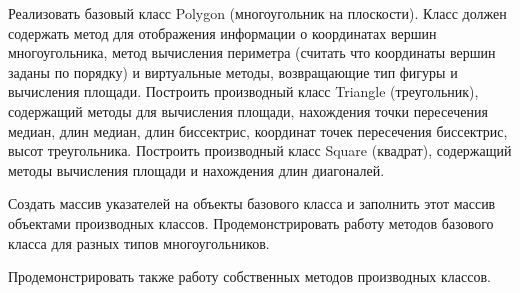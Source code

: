 Реализовать базовый класс Polygon (многоугольник на
		плоскости). Класс должен содержать метод для отображения
информации о координатах вершин многоугольника, метод
вычисления периметра (считать что координаты вершин
		заданы по порядку) и виртуальные методы, возвращающие
тип фигуры и вычисления площади. Построить производный
класс Triangle (треугольник), содержащий методы для
вычисления площади, нахождения точки пересечения
медиан, длин медиан, длин биссектрис, координат точек
пересечения биссектрис, высот треугольника.
Построить
производный класс Square (квадрат), содержащий методы
вычисления площади и нахождения длин диагоналей.

Создать массив указателей на объекты базового класса и
заполнить этот массив объектами производных классов.
Продемонстрировать работу методов базового класса для
разных типов многоугольников.

Продемонстрировать также
работу собственных методов производных классов.
